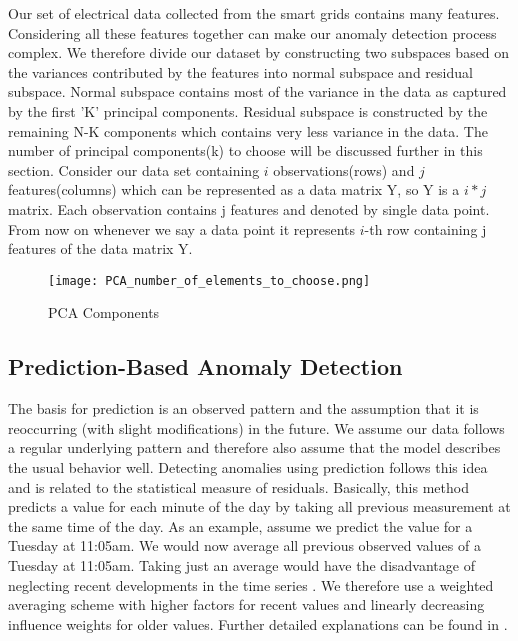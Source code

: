 Our set of electrical data collected from the smart grids contains many features. Considering all these features together can make our anomaly detection process complex. We therefore divide our dataset by constructing two subspaces based on the variances contributed by the features into normal subspace and residual subspace. Normal subspace contains most of the variance in the data as captured by the first 'K' principal components. Residual subspace is constructed by the remaining N-K components which contains very less variance in the data. The number of principal components(k) to choose will be discussed further in this section. Consider our data set containing $i$ observations(rows) and $j$ features(columns) which can be represented as a data matrix Y, so Y is a $i * j$ matrix. Each observation contains j features and denoted by single data point. From now on whenever we say a data point it represents $i$-th row containing j features of the data matrix Y.
\begin{figure}[tph!]
\centerline{\texttt{[image: PCA\_number\_of\_elements\_to\_choose.png]}}
    \caption{PCA Components}
    \label{fig:verticalcell}
\end{figure}

\subsection*{Prediction-Based Anomaly Detection}
The basis for prediction is an observed pattern and the assumption that it is reoccurring (with slight modifications) in the future. We assume our data follows a regular underlying pattern
and therefore also assume that the model describes the usual behavior well. Detecting anomalies using prediction follows this idea and is related to the statistical measure of residuals. Basically, this method predicts a value for each minute of the day by taking all previous measurement at the same time of the day. As an example, assume we predict the value for a Tuesday at 11:05am. We would now average all previous observed values of a Tuesday at 11:05am. Taking just an average would have the disadvantage of neglecting recent developments in the time series \cite{janetzko2014anomaly}. We therefore use a weighted averaging scheme with higher factors for recent values and linearly decreasing influence weights for older values. Further detailed explanations can be found in \cite{hao2011visual}.

